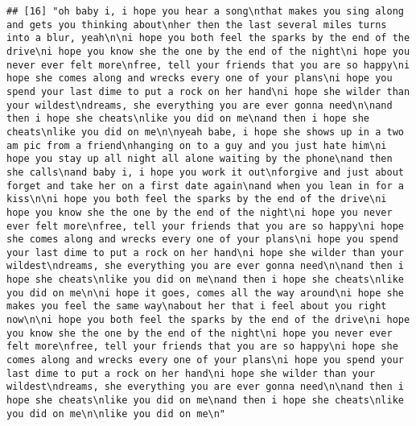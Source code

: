 \documentclass[]{article}
\begin{document}
\begin{verbatim}
## [16] "oh baby i, i hope you hear a song\nthat makes you sing along and gets you thinking about\nher then the last several miles turns into a blur, yeah\n\ni hope you both feel the sparks by the end of the drive\ni hope you know she the one by the end of the night\ni hope you never ever felt more\nfree, tell your friends that you are so happy\ni hope she comes along and wrecks every one of your plans\ni hope you spend your last dime to put a rock on her hand\ni hope she wilder than your wildest\ndreams, she everything you are ever gonna need\n\nand then i hope she cheats\nlike you did on me\nand then i hope she cheats\nlike you did on me\n\nyeah babe, i hope she shows up in a two am pic from a friend\nhanging on to a guy and you just hate him\ni hope you stay up all night all alone waiting by the phone\nand then she calls\nand baby i, i hope you work it out\nforgive and just about forget and take her on a first date again\nand when you lean in for a kiss\n\ni hope you both feel the sparks by the end of the drive\ni hope you know she the one by the end of the night\ni hope you never ever felt more\nfree, tell your friends that you are so happy\ni hope she comes along and wrecks every one of your plans\ni hope you spend your last dime to put a rock on her hand\ni hope she wilder than your wildest\ndreams, she everything you are ever gonna need\n\nand then i hope she cheats\nlike you did on me\nand then i hope she cheats\nlike you did on me\n\ni hope it goes, comes all the way around\ni hope she makes you feel the same way\nabout her that i feel about you right now\n\ni hope you both feel the sparks by the end of the drive\ni hope you know she the one by the end of the night\ni hope you never ever felt more\nfree, tell your friends that you are so happy\ni hope she comes along and wrecks every one of your plans\ni hope you spend your last dime to put a rock on her hand\ni hope she wilder than your wildest\ndreams, she everything you are ever gonna need\n\nand then i hope she cheats\nlike you did on me\nand then i hope she cheats\nlike you did on me\n\nlike you did on me\n"                                                                                                                                                                                                                                                                                                                                                                                                                                                                                                                                                                                                                                                                                                                                                                                               

\end{verbatim}
\end{document}

